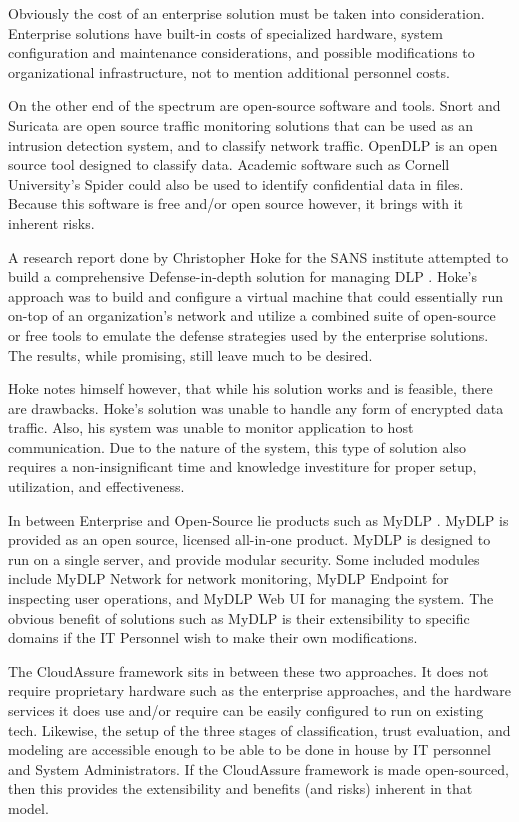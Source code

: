 Obviously the cost
of an enterprise solution must be taken into consideration. Enterprise solutions
have built-in costs of specialized hardware, system configuration and
maintenance considerations, and possible modifications to organizational
infrastructure, not to mention additional personnel costs.  

On the other end of
the spectrum are open-source software and tools. Snort \autocite{Parker2013} and
Suricata \autocite{Jonkman2013}
are open source traffic monitoring solutions that can be used as an intrusion
detection system, and to classify network traffic. OpenDLP \autocite{Gavin2012} is an open
source tool designed to classify data. Academic software such as Cornell
University’s Spider \autocite{Cornell2013} could also be used to identify confidential data in
files. Because this software is free and/or open source however, it brings with
it inherent risks.  

A research report done by Christopher Hoke for the SANS
institute attempted to build a comprehensive Defense-in-depth solution for
managing DLP \autocite{Hoke2012}.  Hoke’s approach was to build and configure a virtual
machine that could essentially run on-top of an organization’s network and
utilize a combined suite of open-source or free tools to emulate the defense
strategies used by the enterprise solutions. The results, while promising, still
leave much to be desired.  

Hoke notes himself however, that while his solution
works and is feasible, there are drawbacks. Hoke’s solution was unable to handle
any form of encrypted data traffic. Also, his system was unable to monitor
application to host communication. Due to the nature of the system, this type of
solution also requires a non-insignificant time and knowledge investiture for
proper setup, utilization, and effectiveness.  

In between Enterprise and
Open-Source lie products such as MyDLP \autocite{MyDLP2013}. MyDLP is provided as an open
source, licensed all-in-one product. MyDLP is designed to run on a single
server, and provide modular security. Some included modules include MyDLP
Network for network monitoring, MyDLP Endpoint for inspecting user operations,
and MyDLP Web UI for managing the system. The obvious benefit of solutions such
as MyDLP is their extensibility to specific domains if the IT Personnel wish to
make their own modifications.  

The CloudAssure framework sits in between these
two approaches. It does not require proprietary hardware such as the enterprise
approaches, and the hardware services it does use and/or require can be easily
configured to run on existing tech. Likewise, the setup of the three stages of
classification, trust evaluation, and modeling are accessible enough to be able
to be done in house by IT personnel and System Administrators. If the
CloudAssure framework is made open-sourced, then this provides the extensibility
and benefits (and risks) inherent in that model. 

